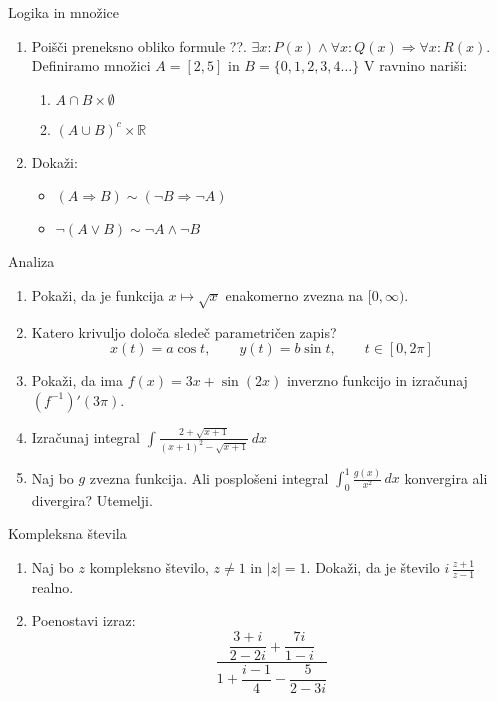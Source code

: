 \begin{frame}{Logika in množice}
	\begin{enumerate}
		\item
		Poišči preneksno obliko formule ??.
		$\exists x: P(x)\land \forall x: Q(x)\Rightarrow\forall x: R(x)$.
		Definiramo množici $A=[2,5]$ in $B =\{0,1,2,3,4\ldots\}$
		V ravnino nariši:
		\begin{enumerate}
		   \item $A \cap B \times \emptyset$
		   \item $(A\cup B)^c \times \mathbb{R}$
		\end{enumerate}
		\item
		Dokaži:
		\begin{itemize}
			\item $(A\Rightarrow B)\sim (\lnot B \Rightarrow \lnot A)$
			\item $\lnot (A \lor B) \sim \lnot A \land \lnot B$
		\end{itemize}
	\end{enumerate}
\end{frame}

\begin{frame}{Analiza}
	\begin{enumerate}
		\item
		Pokaži, da je funkcija $ x \mapsto \sqrt {x} $ enakomerno zvezna na $[0,\infty)$.
		\item 
		Katero krivuljo določa sledeč parametričen zapis?
		$$
		   x(t) = a \cos t, \qquad %
		   y(t) = b \sin t, \qquad %
		   t \in [0, 2 \pi]
		$$ 
		\item
		Pokaži, da ima $f(x) = 3x +\sin (2x)$ inverzno funkcijo in izračunaj $(f^{-1})'(3\pi)$.
		
		\item
		Izračunaj integral 
		$ \displaystyle \int \frac{2+\sqrt{x+1}}{(x+1)^2-\sqrt{x+1}} \, dx $
		\item 
		Naj bo $g$ zvezna funkcija. Ali posplošeni integral 
		$\int_0^1 \frac{g(x)}{x^2}\, dx$
		konvergira ali divergira? Utemelji.
	\end{enumerate}
\end{frame}

\begin{frame}{Kompleksna števila}
	\begin{enumerate}
		\item
		Naj bo $z$ kompleksno število, $z \ne 1$ in $|z|=1$.
		Dokaži, da je število \( i \, \frac{z+1}{z-1} \) realno.
		\item
		Poenostavi izraz:
		$$
           \frac{\dfrac{3+i}{2-2i}+\dfrac{7i}{1-i}}{1+\dfrac{i-1}{4}-\dfrac{5}{2-3i}}
		$$
	\end{enumerate}
\end{frame}